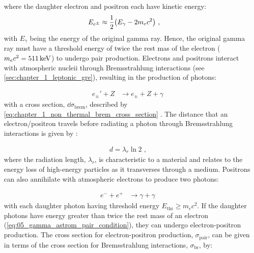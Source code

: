 \noindent where the daughter electron and positron each have kinetic energy:
\begin{equation}
    \begin{aligned}
    E_{e^\pm}&\approx \frac{1}{2}\qty(E_\gamma-2m_ec^2)\text{ ,}
    \end{aligned} \label{eq:05_gamma_astrom_pair_condition}
\end{equation}
\noindent with $E_\gamma$ being the energy of the original gamma ray. Hence, the original gamma ray must have a threshold energy of twice the rest mas of the electron ($m_ec^2=511\,\si{\kilo\electronvolt}$) to undergo pair production.
\newpar
Electrons and positrons interact with atmospheric nucleii through Bremsstrahlung interactions (see \autoref{sec:chapter_1_leptonic_gre}), resulting in the production of photons:

\begin{equation}
    \begin{aligned}
    e_\pm' + Z & \rightarrow e_{\pm} + Z + \gamma
    \end{aligned}
\end{equation}
\noindent with a cross section, $\dd{\sigma}_\text{brem}$, described by \autoref{eq:chapter_1_non_thermal_brem_cross_section} . The distance that an \mbox{electron/positron} travels before radiating a photon through Bremsstrahlung interactions is given by \citep{MATTHEWS2005387}:

\begin{equation}
    \begin{aligned}
    d=\lambda_r \ln 2\text{ ,}
    \end{aligned}
\end{equation}
\noindent where the radiation length, $\lambda_r$, is characteristic to a material and relates to the energy loss of high-energy particles as it transverses through a medium.
\newpar 
Positrons can also annihilate with atmospheric electrons to produce two photons:

\begin{equation}
    \begin{aligned}
    e^- + e^+&\rightarrow \gamma + \gamma
    \end{aligned}
\end{equation}
with each daughter photon having threshold energy $E_\text{thr}\geq m_ec^2$. If the daughter photons have energy greater than twice the rest mass of an electron (\autoref{eq:05_gamma_astrom_pair_condition}), they can undergo electron-positron production. The cross section for electron-positron production, $\sigma_\text{pair}$, can be given in terms of the cross section for Bremsstrahlung interactions, $\sigma_\text{br}$, by:

